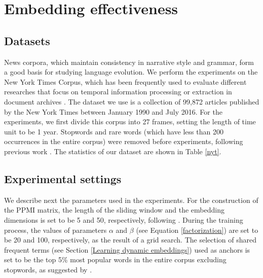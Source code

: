 \documentclass[output=paper]{langsci/langscibook}
\begin{document}
\section{Embedding effectiveness}
\label{embedding_effectiveness}
\subsection{Datasets}
\label{datasets}
News corpora, which maintain consistency in narrative style and grammar, form a good basis for studying language evolution.
We perform the experiments on the New York Times Corpus, which has been frequently used to evaluate different researches that focus on temporal information processing or extraction in document archives \citep{campos2014survey}. 
The dataset we use \citep{yao2018dynamic} is a collection of 99,872 articles published by the New York Times between January 1990 and July 2016. For the experiments, we first divide this corpus into 27 frames, setting the length of time unit to be 1 year. Stopwords and rare words (which have less than 200 occurrences in the entire corpus) were removed before experiments, following  previous work \citep{zhang-etal-2015-omnia}.
The statistics of our dataset are shown in Table \ref{nyt}.

\begin{table}
\caption{Summary of the New York Times dataset\label{nyt}}
\end{table}

\subsection{Experimental settings}
\label{settings}

We describe next the parameters used in the experiments. 
For the construction of the PPMI matrix, the length of the sliding window and the embedding dimensions is set to be 5 and 50, respectively, following \citep{yao2018dynamic}. During the training process, the values of  parameters $\alpha$ and $\beta$ (see Equation \eqref{factorization}) are set to be 20 and 100, respectively, as the result of a grid search. The selection of shared frequent terms (see Section \ref{Learning dynamic embeddings}) used as anchors is set to be the top 5\% most popular words in the entire corpus excluding stopwords, as suggested by \citep{zhang-etal-2015-omnia}.
\end{document}
